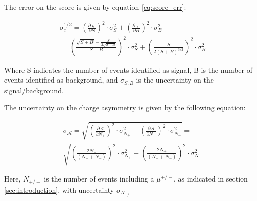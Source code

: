 \documentclass[%
 reprint,
 amsmath,amssymb,
 aps,
]{revtex4-2}
\begin{document}
The error on the score is given by equation \ref{eq:score_err}:

\begin{multline}\label{eq:score_err}
    \sigma_{\varsigma}^{1/2} = \left(\frac{\partial \varsigma}{\partial S}\right)^2 \cdot \sigma_S^2 + \left(\frac{\partial \varsigma}{\partial B}\right)^2 \cdot \sigma_B^2 \\
    = \left(\frac{\sqrt{S + B} - \frac{S}{2\sqrt{S+B}}}{S + B }\right)^2 \cdot \sigma_S^2 + \left(\frac{S}{2 \left(S+B\right)^{3/2}}\right)^2 \cdot \sigma_B^2
\end{multline}

Where S indicates the number of events identified as signal, B is the number of events identified as background, and $\sigma_{S,B}$ is the uncertainty on the signal/background.

The uncertainty on the charge asymmetry is given by the following equation:

\begin{multline}\label{eq:charge_asym_err}
    \sigma_{\mathcal{A}} = \sqrt{
    \left(\frac{\partial \mathcal{A}}{\partial N_+}\right)^2 \cdot \sigma_{N_+}^2 + \left(\frac{\partial \mathcal{A}}{\partial N_-}\right)^2 \cdot \sigma_{N_-}^2
    } 
    = \\ 
    \sqrt{
    \left(\frac{2 N_-}{\left(N_+ + N_- \right)}\right)^2 \cdot \sigma_{N_+}^2 + \left(\frac{2 N_+}{\left(N_+ + N_- \right)}\right)^2 \cdot \sigma_{N_-}^2
    } 
\end{multline}

Here, $N_{+/-}$ is the number of events including a $\mu^{+/-}$, as indicated in section \ref{sec:introduction}, with uncertainty $\sigma_{N_{+/-}}$




\end{document}

